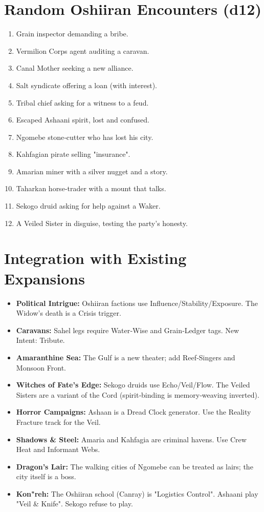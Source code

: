 \documentclass[11pt]{book}
\begin{document}
\section{Random Oshiiran Encounters (d12)}

\begin{enumerate}
\item Grain inspector demanding a bribe.
\item Vermilion Corps agent auditing a caravan.
\item Canal Mother seeking a new alliance.
\item Salt syndicate offering a loan (with interest).
\item Tribal chief asking for a witness to a feud.
\item Escaped Ashaani spirit, lost and confused.
\item Ngomebe stone‑cutter who has lost his city.
\item Kahfagian pirate selling "insurance".
\item Amarian miner with a silver nugget and a story.
\item Taharkan horse‑trader with a mount that talks.
\item Sekogo druid asking for help against a Waker.
\item A Veiled Sister in disguise, testing the party's honesty.
\end{enumerate}

\section{Integration with Existing Expansions}

\begin{itemize}
\item \textbf{Political Intrigue:} Oshiiran factions use Influence/Stability/Exposure. The Widow's death is a Crisis trigger.
\item \textbf{Caravans:} Sahel legs require Water‑Wise and Grain‑Ledger tags. New Intent: Tribute.
\item \textbf{Amaranthine Sea:} The Gulf is a new theater; add Reef‑Singers and Monsoon Front.
\item \textbf{Witches of Fate's Edge:} Sekogo druids use Echo/Veil/Flow. The Veiled Sisters are a variant of the Cord (spirit‑binding is memory‑weaving inverted).
\item \textbf{Horror Campaigns:} Ashaan is a Dread Clock generator. Use the Reality Fracture track for the Veil.
\item \textbf{Shadows \& Steel:} Amaria and Kahfagia are criminal havens. Use Crew Heat and Informant Webs.
\item \textbf{Dragon's Lair:} The walking cities of Ngomebe can be treated as lairs; the city itself is a boss.
\item \textbf{Kon"reh:} The Oshiiran school (Canray) is "Logistics Control". Ashaani play "Veil \& Knife". Sekogo refuse to play.
\end{itemize}
\end{document}
